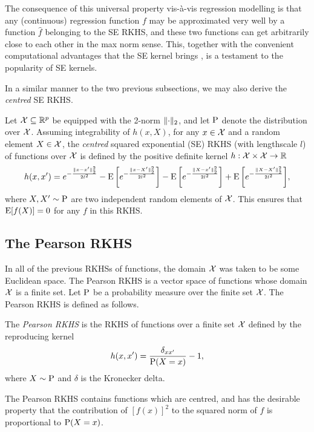 The consequence of this universal property vis-à-vis regression modelling is that any (continuous) regression function $f$ may be approximated very well by a function $\hat f$ belonging to the SE RKHS, and these two functions can get arbitrarily close to each other in the max norm sense.
This, together with the convenient computational advantages that the SE kernel brings \citep{raykar2007fast}, is a testament to the popularity of SE kernels.

In a similar manner to the two previous subsections, we may also derive the \emph{centred} SE RKHS. 

\begin{definition}
  Let ${\mathcal X} \subseteq \mathbb{R}^p$ be equipped with the 2-norm $\lVert\cdot\rVert_2$, and let $\operatorname{P}$ denote the distribution over ${\mathcal X}$.
  Assuming integrability of $h(x,X)$, for any $x\in{\mathcal X}$ and a random element $X\in{\mathcal X}$, the \emph{centred} squared exponential (SE) RKHS (with lengthscale $l$) of functions over ${\mathcal X}$ is defined by the positive definite kernel $h:{\mathcal X}\times{\mathcal X}\to\mathbb{R}$ 
  \[
    h(x,x') = e^{-\frac{\lVert x-x'\rVert_2^2}{2l^2}} 
    - \operatorname{E} \bigg[ e^{-\frac{\lVert x-X'\rVert_2^2}{2l^2}} \bigg] 
    - \operatorname{E} \bigg[ e^{-\frac{\lVert X-x'\rVert_2^2}{2l^2}} \bigg] 
    + \operatorname{E} \bigg[ e^{-\frac{\lVert X-X'\rVert_2^2}{2l^2}} \bigg],
  \]
  where $X,X'\sim\operatorname{P}$ are two independent random elements of ${\mathcal X}$. 
  This ensures that $\operatorname{E}[ f(X) ] = 0$ for any $f$ in this RKHS.
\end{definition}

\subsection{The Pearson RKHS}

In all of the previous RKHSs of functions, the domain ${\mathcal X}$ was taken to be some Euclidean space. 
The Pearson RKHS is a vector space of functions whose domain ${\mathcal X}$ is a finite set.
Let $\operatorname{P}$ be a probability measure over the finite set ${\mathcal X}$. 
The Pearson RKHS is defined as follows.

\begin{definition}\label{def:pearson}
  The \emph{Pearson RKHS} is the RKHS of functions over a finite set ${\mathcal X}$ defined by the reproducing kernel
  \[
    h(x,x') = \frac{\delta_{xx'}}{\operatorname{P}(X=x)} - 1,
  \]
  where $X \sim \operatorname{P}$ and $\delta$ is the Kronecker delta.
\end{definition}

The Pearson RKHS contains functions which are centred, and has the desirable property that the contribution of $[f(x)]^2$ to the squared norm of $f$ is proportional to $\operatorname{P}(X=x)$.

